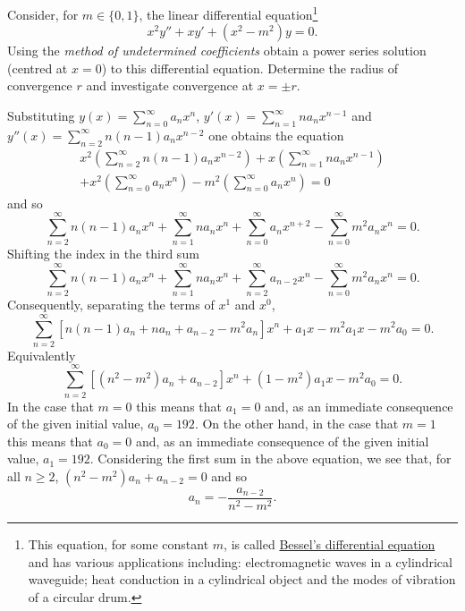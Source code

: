 \begin{task}
    Consider, for $m\in \{0,1\}$, the linear differential equation\footnote{This equation, for some constant $m$, is called \href{https://en.wikipedia.org/wiki/Bessel_function}{Bessel's differential equation} and has various applications including: electromagnetic waves in a cylindrical waveguide; heat conduction in a cylindrical object and the modes of vibration of a circular drum.}
    $$
        x^2y'' + xy' + (x^2-m^2) y = 0.
    $$
    Using the \emph{method of undetermined coefficients} obtain a power series solution (centred at \(x=0\)) to this differential equation.
    Determine the radius of convergence \(r\) and investigate convergence at \(x = \pm r\).
\end{task}

\begin{solution}
    Substituting $y(x) = \sum_{n=0}^{\infty} a_n x^n$, $y'(x) = \sum_{n=1}^{\infty} n a_n x^{n-1}$ and $y''(x) = \sum_{n=2}^{\infty} n(n-1) a_n x^{n-2}$ one obtains the equation
    \begin{multline*}
        x^2 \left(\sum_{n=2}^{\infty} n(n-1) a_n x^{n-2}\right) + x \left(\sum_{n=1}^{\infty} n a_n x^{n-1}\right) \\ + x^2 \left(\sum_{n=0}^{\infty} a_n x^n\right) - m^2 \left(\sum_{n=0}^{\infty} a_n x^n\right) = 0
    \end{multline*}
    and so
    $$
        \sum_{n=2}^{\infty} n(n-1) a_n x^{n} + \sum_{n=1}^{\infty} n a_n x^{n} + \sum_{n=0}^{\infty} a_n x^{n+2} -  \sum_{n=0}^{\infty} m^2 a_n x^n = 0.
    $$
    Shifting the index in the third sum
    $$
        \sum_{n=2}^{\infty} n(n-1) a_n x^{n} + \sum_{n=1}^{\infty} n a_n x^{n} + \sum_{n=2}^{\infty} a_{n-2} x^{n} -  \sum_{n=0}^{\infty} m^2 a_n x^n = 0.
    $$
    Consequently, separating the terms of \(x^1\) and \(x^0\),
    $$
        \sum_{n=2}^{\infty}  \left[ n(n-1)a_n + n a_n +  a_{n-2} -m^2a_n  \right] x^{n} + a_1 x - m^2 a_1 x - m^2 a_0  =0.
    $$
    Equivalently
    $$
        \sum_{n=2}^{\infty}  \left[ (n^2 - m^2)a_n +  a_{n-2}   \right] x^{n} + (1 - m^2 )a_1 x - m^2 a_0  =0.
    $$
    In the case that $m=0$ this means that $a_1 = 0$ and, as an immediate consequence of the given initial value, $a_0 = 192$.
    On the other hand, in the case that $m=1$ this means that $a_0=0$ and, as an immediate consequence of the given initial value, $a_1 = 192$.
    Considering the first sum in the above equation, we see that, for all $n\geq 2$,  $ (n^2 - m^2)a_n +  a_{n-2}  = 0 $ and so
    $$
        a_n = - \frac{a_{n-2}}{n^2 - m^2}.
$$
\end{solution}
